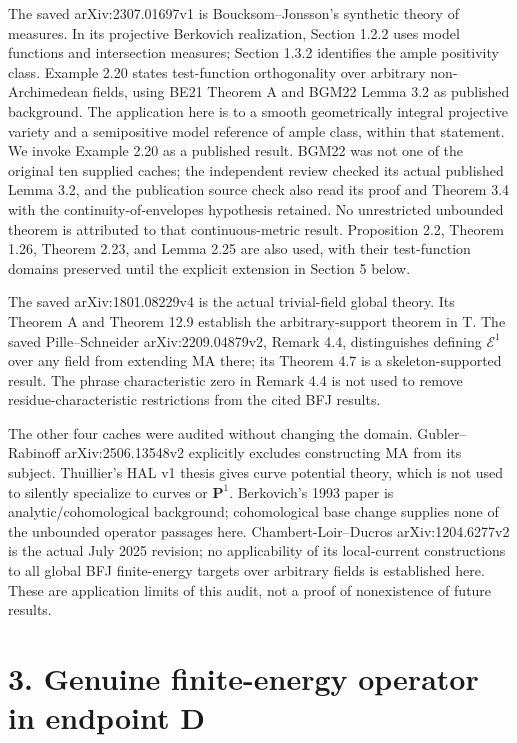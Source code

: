 \documentclass[11pt]{article}
\begin{document}
The saved arXiv:2307.01697v1 is Boucksom--Jonsson's synthetic theory of measures. In its projective Berkovich realization, Section 1.2.2 uses model functions and intersection measures; Section 1.3.2 identifies the ample positivity class. Example 2.20 states test-function orthogonality over arbitrary non-Archimedean fields, using BE21 Theorem A and BGM22 Lemma 3.2 as published background. The application here is to a smooth geometrically integral projective variety and a semipositive model reference of ample class, within that statement. We invoke Example 2.20 as a published result. BGM22 was not one of the original ten supplied caches; the independent review checked its actual published Lemma 3.2, and the publication source check also read its proof and Theorem 3.4 with the continuity-of-envelopes hypothesis retained. No unrestricted unbounded theorem is attributed to that continuous-metric result. Proposition 2.2, Theorem 1.26, Theorem 2.23, and Lemma 2.25 are also used, with their test-function domains preserved until the explicit extension in Section 5 below.

The saved arXiv:1801.08229v4 is the actual trivial-field global theory. Its Theorem A and Theorem 12.9 establish the arbitrary-support theorem in T. The saved Pille--Schneider arXiv:2209.04879v2, Remark 4.4, distinguishes defining \(\mathcal E^1\) over any field from extending MA there; its Theorem 4.7 is a skeleton-supported result. The phrase characteristic zero in Remark 4.4 is not used to remove residue-characteristic restrictions from the cited BFJ results.

The other four caches were audited without changing the domain. Gubler--Rabinoff arXiv:2506.13548v2 explicitly excludes constructing MA from its subject. Thuillier's HAL v1 thesis gives curve potential theory, which is not used to silently specialize to curves or \(\mathbf P^1\). Berkovich's 1993 paper is analytic/cohomological background; cohomological base change supplies none of the unbounded operator passages here. Chambert-Loir--Ducros arXiv:1204.6277v2 is the actual July 2025 revision; no applicability of its local-current constructions to all global BFJ finite-energy targets over arbitrary fields is established here. These are application limits of this audit, not a proof of nonexistence of future results.

\section*{3. Genuine finite-energy operator in endpoint D}
\end{document}
